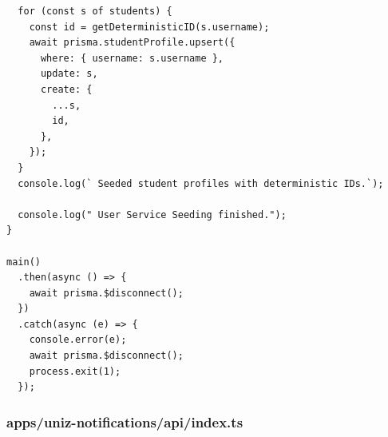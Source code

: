 \documentclass[11pt,a4paper,oneside]{article}
\begin{document}
\begin{lstlisting}
  for (const s of students) {
    const id = getDeterministicID(s.username);
    await prisma.studentProfile.upsert({
      where: { username: s.username },
      update: s,
      create: {
        ...s,
        id,
      },
    });
  }
  console.log(` Seeded student profiles with deterministic IDs.`);

  console.log(" User Service Seeding finished.");
}

main()
  .then(async () => {
    await prisma.$disconnect();
  })
  .catch(async (e) => {
    console.error(e);
    await prisma.$disconnect();
    process.exit(1);
  });

\end{lstlisting}
\subsubsection*{apps/uniz-notifications/api/index.ts}
\end{document}
